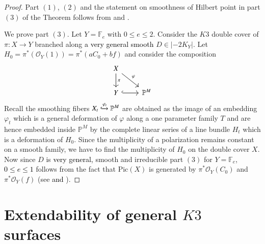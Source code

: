 \documentclass[11pt,twoside]{amsart}
\theoremstyle{plain}
\numberwithin{equation}{section}
\theoremstyle{definition}
\begin{document}
\begin{proof} Part $(1)$, $(2)$ and the statement on smoothness of Hilbert point in part $(3)$ of the Theorem follows from \cite[Theorem $3.1 (3)$, Theorem $4.3$, Theorem $4.4$, Theorem $5.1$]{BMR21} and \cite[Proposition $1.7$, Theorem $3.5$, Theorem $4.1$]{GP97}.
    

We prove part $(3)$. Let $Y = \mathbb{F}_e$ with $0 \leq e \leq 2$. Consider the $K3$ double cover of $\pi:X \to Y$ branched along \textcolor{black}{a very general smooth} $D \in |-2K_Y|$. Let $H_0 = \pi^*(\mathcal{O}_{Y}(1)) = \pi^*(aC_0+bf)$ and consider the composition  
\[
\begin{tikzcd}
X \arrow[dr, "\varphi"] \arrow[d, "\pi"] & \\
Y \arrow[r, hook] & \mathbb{P}^M
\end{tikzcd}
\]
Recall the smoothing fibers $X_t \xhookrightarrow{\varphi_t} \mathbb{P}^M$ are obtained as the image of an embedding $\varphi_t$ which is a general deformation of $\varphi$ along a one parameter family $T$ and are hence embedded inside $\mathbb{P}^M$ by the complete linear series of a line bundle $H_t$ which is a deformation of $H_0$. Since the multiplicity of a polarization remains constant on a smooth family, we have to find the multiplicity of $H_0$ on the double cover $X$. Now since $D$ is \textcolor{black}{very general,} smooth and irreducible part $(3)$ for $Y = \mathbb{F}_e$, \textcolor{black}{$0 \leq e \leq 1$} follows from the fact that $\textrm{Pic}(X)$ is generated by $\pi^*\mathcal{O}_Y(C_0)$ and $\pi^*\mathcal{O}_Y(f)$ (see \cite[Proposition $6.3$]{AHL10} \textcolor{black}{and \cite[Proposition $6.5$ (i), (iii)]{AHL10}}).

\end{proof}

\section{Extendability of general $K3$ surfaces}
\end{document}
